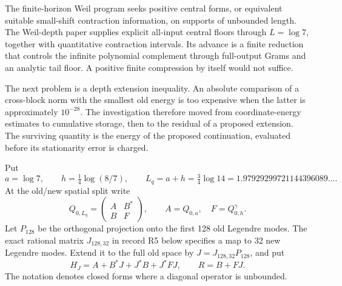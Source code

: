 \documentclass[11pt]{article}
\theoremstyle{remark}\newtheorem{remark}[theorem]{Remark}
\begin{document}
The finite-horizon Weil program seeks positive central forms, or equivalent suitable small-shift contraction information, on supports of unbounded length. The Weil-depth paper supplies explicit all-input central floors through $L=\log7$, together with quantitative contraction intervals. Its advance is a finite reduction that controls the infinite polynomial complement through full-output Grams and an analytic tail floor. A positive finite compression by itself would not suffice.

The next problem is a depth extension inequality. An absolute comparison of a cross-block norm with the smallest old energy is too expensive when the latter is approximately $10^{-28}$. The investigation therefore moved from coordinate-energy estimates to cumulative storage, then to the residual of a proposed extension. The surviving quantity is the energy of the proposed continuation, evaluated before its stationarity error is charged.

Put
\begin{equation}\label{eq:depth}
 a=\log7,\qquad h=\tfrac14\log(8/7),\qquad
 L_q=a+h=\tfrac34\log14=1.97929299721144396089\ldots.
\end{equation}
At the old/new spatial split write
\[
 Q_{0,L_q}=\begin{pmatrix}A&B^*\\B&F\end{pmatrix},\qquad
 A=Q_{0,a},\quad F=Q^\gamma_{0,h}.
\]
Let $P_{128}$ be the orthogonal projection onto the first 128 old Legendre modes. The exact rational matrix $J_{128,32}$ in record R5 below specifies a map to 32 new Legendre modes. Extend it to the full old space by $J=J_{128,32}P_{128}$, and put
\begin{equation}\label{eq:HR}
 H_J=A+B^*J+J^*B+J^*FJ,\qquad R=B+FJ.
\end{equation}
The notation denotes closed forms where a diagonal operator is unbounded.
\end{document}
